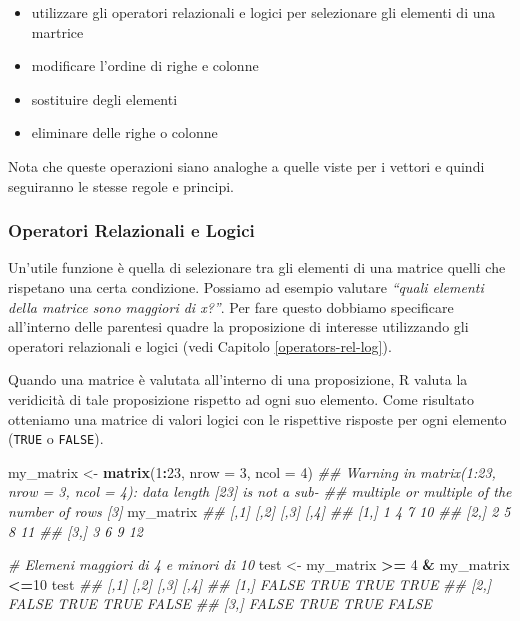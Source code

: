 \documentclass[
]{book}
\newenvironment{Shaded}{\begin{snugshade}}{\end{snugshade}}
\newcommand{\CommentTok}[1]{\textcolor[rgb]{0.56,0.35,0.01}{\textit{#1}}}
\newcommand{\DataTypeTok}[1]{\textcolor[rgb]{0.13,0.29,0.53}{#1}}
\newcommand{\DecValTok}[1]{\textcolor[rgb]{0.00,0.00,0.81}{#1}}
\newcommand{\KeywordTok}[1]{\textcolor[rgb]{0.13,0.29,0.53}{\textbf{#1}}}
\newcommand{\NormalTok}[1]{#1}
\newcommand{\OperatorTok}[1]{\textcolor[rgb]{0.81,0.36,0.00}{\textbf{#1}}}
\newcommand{\StringTok}[1]{\textcolor[rgb]{0.31,0.60,0.02}{#1}}
\providecommand{\tightlist}{%
  \setlength{\itemsep}{0pt}\setlength{\parskip}{0pt}}
\begin{document}
\begin{itemize}
\tightlist
\item
  utilizzare gli operatori relazionali e logici per selezionare gli elementi di una martrice
\item
  modificare l'ordine di righe e colonne
\item
  sostituire degli elementi
\item
  eliminare delle righe o colonne
\end{itemize}

Nota che queste operazioni siano analoghe a quelle viste per i vettori e quindi seguiranno le stesse regole e principi.

\hypertarget{operatori-relazionali-e-logici-1}{%
\subsubsection*{Operatori Relazionali e Logici}\label{operatori-relazionali-e-logici-1}}

Un'utile funzione è quella di selezionare tra gli elementi di una matrice quelli che rispetano una certa condizione. Possiamo ad esempio valutare \emph{``quali elementi della matrice sono maggiori di x?''}. Per fare questo dobbiamo specificare all'interno delle parentesi quadre la proposizione di interesse utilizzando gli operatori relazionali e logici (vedi Capitolo \ref{operators-rel-log}).

Quando una matrice è valutata all'interno di una proposizione, R valuta la veridicità di tale proposizione rispetto ad ogni suo elemento. Come risultato otteniamo una matrice di valori logici con le rispettive risposte per ogni elemento (\texttt{TRUE} o \texttt{FALSE}).

\begin{Shaded}
\begin{Highlighting}[]
\NormalTok{my_matrix <-}\StringTok{ }\KeywordTok{matrix}\NormalTok{(}\DecValTok{1}\OperatorTok{:}\DecValTok{23}\NormalTok{, }\DataTypeTok{nrow =} \DecValTok{3}\NormalTok{, }\DataTypeTok{ncol =} \DecValTok{4}\NormalTok{)}
\CommentTok{## Warning in matrix(1:23, nrow = 3, ncol = 4): data length [23] is not a sub-}
\CommentTok{## multiple or multiple of the number of rows [3]}
\NormalTok{my_matrix}
\CommentTok{##      [,1] [,2] [,3] [,4]}
\CommentTok{## [1,]    1    4    7   10}
\CommentTok{## [2,]    2    5    8   11}
\CommentTok{## [3,]    3    6    9   12}

\CommentTok{# Elemeni maggiori di 4 e minori di 10}
\NormalTok{test <-}\StringTok{ }\NormalTok{my_matrix }\OperatorTok{>=}\StringTok{ }\DecValTok{4} \OperatorTok{&}\StringTok{ }\NormalTok{my_matrix }\OperatorTok{<=}\DecValTok{10}
\NormalTok{test}
\CommentTok{##       [,1] [,2] [,3]  [,4]}
\CommentTok{## [1,] FALSE TRUE TRUE  TRUE}
\CommentTok{## [2,] FALSE TRUE TRUE FALSE}
\CommentTok{## [3,] FALSE TRUE TRUE FALSE}
\end{Highlighting}
\end{Shaded}
\end{document}
